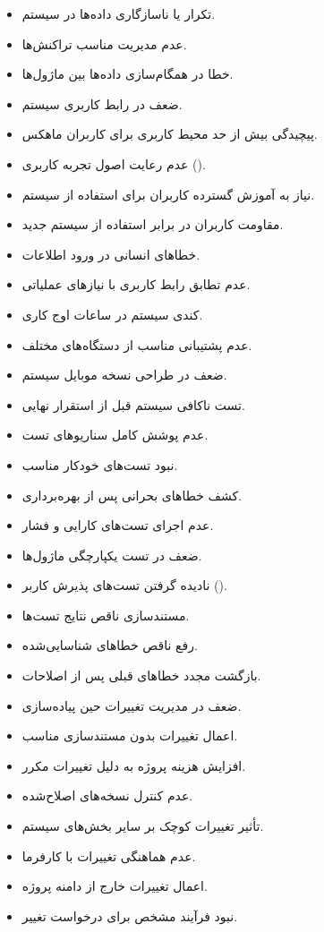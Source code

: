\documentclass[12pt,a4paper]{report}
\begin{document}
\begin{itemize}
ناسازگاری داده‌های قدیمی با ساختار جدید.
\item 
تکرار یا ناسازگاری داده‌ها در سیستم.
\item 
عدم مدیریت مناسب تراکنش‌ها.
\item 
خطا در همگام‌سازی داده‌ها بین ماژول‌ها.
\item 
ضعف در رابط کاربری سیستم.
\item 
پیچیدگی بیش از حد محیط کاربری برای کاربران ماهکس.
\item 
عدم رعایت اصول تجربه کاربری ().
\item 
نیاز به آموزش گسترده کاربران برای استفاده از سیستم.
\item 
مقاومت کاربران در برابر استفاده از سیستم جدید.
\item 
خطاهای انسانی در ورود اطلاعات.
\item 
عدم تطابق رابط کاربری با نیازهای عملیاتی.
\item 
کندی سیستم در ساعات اوج کاری.
\item 
عدم پشتیبانی مناسب از دستگاه‌های مختلف.
\item 
ضعف در طراحی نسخه موبایل سیستم.
\item 
تست ناکافی سیستم قبل از استقرار نهایی.
\item 
عدم پوشش کامل سناریوهای تست.
\item 
نبود تست‌های خودکار مناسب.
\item 
کشف خطاهای بحرانی پس از بهره‌برداری.
\item 
عدم اجرای تست‌های کارایی و فشار.
\item 
ضعف در تست یکپارچگی ماژول‌ها.
\item 
نادیده گرفتن تست‌های پذیرش کاربر ().
\item 
مستندسازی ناقص نتایج تست‌ها.
\item 
رفع ناقص خطاهای شناسایی‌شده.
\item 
بازگشت مجدد خطاهای قبلی پس از اصلاحات.
\item 
ضعف در مدیریت تغییرات حین پیاده‌سازی.
\item 
اعمال تغییرات بدون مستندسازی مناسب.
\item 
افزایش هزینه پروژه به دلیل تغییرات مکرر.
\item 
عدم کنترل نسخه‌های اصلاح‌شده.
\item 
تأثیر تغییرات کوچک بر سایر بخش‌های سیستم.
\item 
عدم هماهنگی تغییرات با کارفرما.
\item 
اعمال تغییرات خارج از دامنه پروژه.
\item 
نبود فرآیند مشخص برای درخواست تغییر.

\end{itemize}
\end{document}
